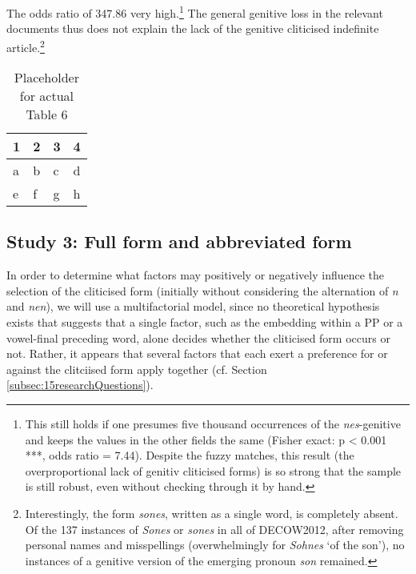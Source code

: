 The odds ratio of 347.86 very high.\footnote{
	This still holds if one presumes five thousand occurrences of the \textit{nes}-genitive and keeps the values in the other fields the same (Fisher exact: p < 0.001 ***, odds ratio = 7.44).
	Despite the fuzzy matches, this result (the overproportional lack of genitiv cliticised forms) is so strong that the sample is still robust, even without checking through it by hand.}
The general genitive loss in the relevant documents thus does not explain the lack of the genitive cliticised indefinite article.\footnote{
	\label{fn:22} Interestingly, the form \textit{sones}, written as a single word, is completely absent. 
	Of the 137 instances of \textit{Sones} or \textit{sones} in all of DECOW2012, after removing personal names and misspellings (overwhelmingly for \textit{Sohnes} `of the son'), no instances of a genitive version of the emerging pronoun \textit{son} remained.}
	
\begin{table}
	\centering
	\begin{tabular}{llll}
		\toprule
		\textbf{1} & \textbf{2} & \textbf{3} & \textbf{4} \\
		\midrule
		a & b & c & d \\
		e & f & g & h \\
		\bottomrule
	\end{tabular}
	\caption{Placeholder for actual Table 6}
	\label{tab:0006}
\end{table}

\subsection{Study 3: Full form and abbreviated form}
\label{subsec:25s3FullFormAbbrevForm}

In order to determine what factors may positively or negatively influence the selection of the cliticised form (initially without considering the alternation of \textit{n} and \textit{nen}), we will use a multifactorial model, since no theoretical hypothesis exists that suggests that a single factor, such as the embedding within a PP or a vowel-final preceding word, alone decides whether the cliticised form occurs or not. 
Rather, it appears that several factors that each exert a preference for or against the clitciised form apply together (cf. Section \ref{subsec:15researchQuestions}).

